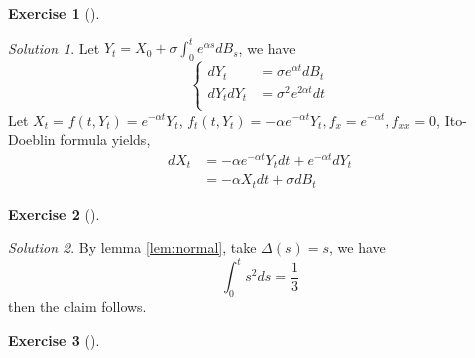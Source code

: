 \documentclass[
]{article}
\theoremstyle{definition}
\theoremstyle{definition}
\theoremstyle{definition}
\newtheorem{exercise}{Exercise}
\theoremstyle{definition}
\theoremstyle{remark}
\newtheorem*{solution}{Solution}
\begin{document}
\begin{exercise}[]
\(\quad\)
\end{exercise}

\begin{solution}
Let \(Y_{t}=X_0+\sigma \int_{0}^{t} e^{\alpha s} d B_{s}\), we have
\[
\begin{cases}
    dY_{t} &= \sigma e^{\alpha t}dB_{t} \\
    dY_{t}dY_{t} &= \sigma^2 e^{2\alpha t}dt \\
\end{cases}
\]
Let \(X_{t}=f(t,Y_{t})=e^{-\alpha t}Y_{t}\), \(f_{t}(t,Y_{t})=- \alpha e^{-\alpha t}Y_{t},f_{x}=e^{-\alpha t},f_{xx}=0\), Ito-Doeblin formula yields,
\[
\begin{aligned}
    dX_{t}&=-\alpha  e^{-\alpha t}  Y_{t}dt+e^{-\alpha t}dY_{t}
    \\ &= 
    -\alpha X_{t}dt+\sigma dB_{t}
\end{aligned}
\]
\end{solution}

\begin{exercise}[]
\(\quad\)
\end{exercise}

\begin{solution}
By lemma \ref{lem:normal}, take \(\Delta(s)=s\), we have
\[
\int_{0}^{t} s^2ds=\frac{1}{3}
\]
then the claim follows.
\end{solution}

\begin{exercise}[]
\(\quad\)
\end{exercise}
\end{document}
